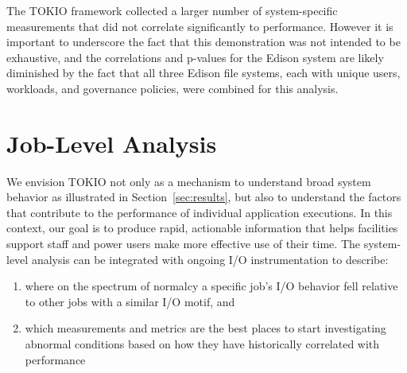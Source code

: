 The TOKIO framework collected a larger number of system-specific measurements that did not correlate significantly to performance.
However it is important to underscore the fact that this demonstration was not intended to be exhaustive, and the correlations and p-values for the Edison system are likely diminished by the fact that all three Edison file systems, each with unique users, workloads, and governance policies, were combined for this analysis.

\section{Job-Level Analysis} \label{sec:results/umami}

We envision TOKIO not only as a mechanism to understand broad system behavior as illustrated in Section~\ref{sec:results}, but also to understand the factors that contribute to the performance of individual application executions.
In this context, our goal is to produce rapid, actionable information that helps facilities support staff and power users make more effective use of their time.
The system-level analysis can be integrated with ongoing I/O instrumentation to describe:

\begin{enumerate}
\item where on the spectrum of normalcy a specific job's I/O behavior fell relative to other jobs with a similar I/O motif, and
\item which measurements and metrics are the best places to start investigating abnormal conditions based on how they have historically correlated with performance
\end{enumerate}

